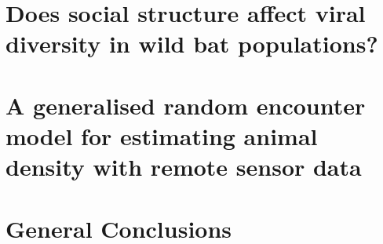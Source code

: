 \documentclass[11pt,phd,a4paper,twoside]{pretty_thesis}
\begin{document}
\chapter[Social structure in wild populations]{Does social structure affect viral diversity in wild bat populations?}
\label{chapterlabel4}



\chapter[gREM for estimating animal density]{A generalised random encounter model for estimating animal density with remote sensor data}
\label{chapterlabel5}


\chapter{General Conclusions}
\label{chapterlabel4}




 


%

\end{document}
